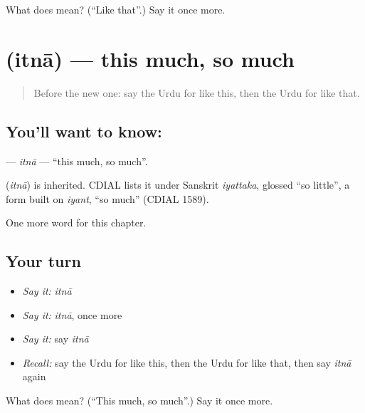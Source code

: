 \begin{tcolorbox}[breakable,colback=teal!4,colframe=teal!35!black,title={Before you move on}]
What does  mean? (\textquotedblleft{}Like that\textquotedblright{}.) Say it once more.
\end{tcolorbox}
\section[\texorpdfstring{\ur{اتنا} (itnā)}{اتنا (itnā)}]{ (itnā) — this much, so much}

\label{lesson:UR-C88-itna}



\begin{quote}
Before the new one: say the Urdu for like this, then the Urdu for like that.
\end{quote}

\subsection*{You'll want to know: }
\textbf{} — \emph{itnā} — \textquotedblleft{}this much, so much\textquotedblright{}.

\begin{cousinweb}
\textbf{} (\emph{itnā}) is inherited. CDIAL lists it under Sanskrit \emph{iyattaka}, glossed \textquotedblleft{}so little\textquotedblright{}, a form built on \emph{iyant}, \textquotedblleft{}so much\textquotedblright{} (CDIAL 1589).
\end{cousinweb}

\begin{grammarlens}[title={What you've built}]
One more word for this chapter.
\end{grammarlens}

\subsection*{Your turn}
\begin{itemize}
\raggedright
  \item \emph{Say it:} \emph{itnā}
  \item \emph{Say it:} \emph{itnā}, once more
  \item \emph{Say it:} say \emph{itnā}
  \item \emph{Recall:} say the Urdu for like this, then the Urdu for like that, then say \emph{itnā} again
\end{itemize}

\begin{tcolorbox}[breakable,colback=teal!4,colframe=teal!35!black,title={Before you move on}]
What does  mean? (\textquotedblleft{}This much, so much\textquotedblright{}.) Say it once more.
\end{tcolorbox}
